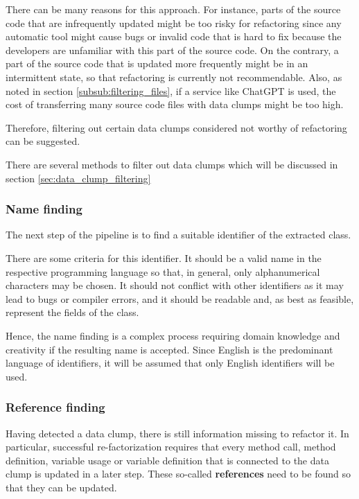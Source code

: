 There can be many reasons for this approach. For instance, parts of the source code that are infrequently updated might be too risky for refactoring since any automatic tool might cause bugs or invalid code that is hard to fix because the developers are unfamiliar with this part of the source code. On the contrary, a part of the source code that is updated more frequently might be in an intermittent state, so that refactoring is currently not recommendable. Also, as noted in section  \ref{subsub:filtering_files}, if a service like ChatGPT is used, the cost of transferring many source code files with data clumps might be too high. 


Therefore, filtering out certain data clumps considered not worthy of refactoring can be suggested.

There are several methods to filter out data clumps which will be discussed in section \ref{sec:data_clump_filtering}

\subsubsection{Name finding}\label{subsec:chap3_data_clump_name_finding}
The next step of the pipeline is to find a suitable identifier of the extracted class.

There are some criteria for this identifier. It should be a valid name in the respective programming language so that, in general, only alphanumerical characters may be chosen. It should not conflict with other identifiers as it may lead to bugs or compiler errors, and it should be readable and, as best as feasible, represent the fields of the class.

Hence, the name finding is a complex process requiring domain knowledge and creativity if the resulting name is accepted. 
Since English is the predominant language of identifiers, it will be assumed that only English identifiers will be used. 

\subsubsection{Reference finding}
 Having detected a data clump, there is still information missing to refactor it. In particular, successful re-factorization requires that every method call, method definition, variable usage or variable definition that is connected to the data clump is updated in a later step. These so-called \textbf{references} need to be found so that they can be updated.

